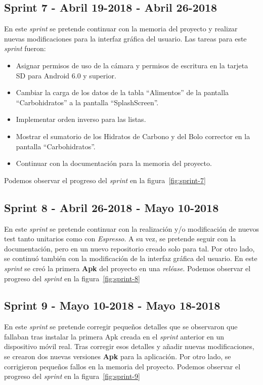 \subsection{Sprint 7 - Abril 19-2018 - Abril 26-2018}
En este \textit{sprint} se pretende continuar con la memoria del proyecto y realizar nuevas modificaciones para la interfaz gráfica del usuario. Las tareas para este \textit{sprint} fueron:
\begin{itemize}
	\item Asignar permisos de uso de la cámara y permisos de escritura en la tarjeta SD para Android 6.0 y superior.
	\item Cambiar la carga de los datos de la tabla ``Alimentos'' de la pantalla ``Carbohidratos'' a la pantalla ``SplashScreen''.
	\item Implementar orden inverso para las listas.
	\item Mostrar el sumatorio de los Hidratos de Carbono y del Bolo corrector en la pantalla ``Carbohidratos''.
	\item Continuar con la documentación para la memoria del proyecto.
\end{itemize}
Podemos observar el progreso del \textit{sprint} en la figura~\ref{fig:sprint-7}
\subsection{Sprint 8 - Abril 26-2018 - Mayo 10-2018}
En este \textit{sprint} se pretende continuar con la realización y/o modificación de nuevos test tanto unitarios como con \textit{Espresso}. A su vez, se pretende seguir con la documentación, pero en un nuevo repositorio creado solo para tal.
Por otro lado, se continuó también con la modificación de la interfaz gráfica del usuario.
En este \textit{sprint} se creó la primera \textbf{Apk} del proyecto en una \textit{reléase}.
Podemos observar el progreso del \textit{sprint} en la figura~\ref{fig:sprint-8}
\subsection{Sprint 9 - Mayo 10-2018 - Mayo 18-2018}
En este \textit{sprint} se pretende corregir pequeños detalles que se observaron que fallaban tras instalar la primera Apk creada en el \textit{sprint} anterior en un dispositivo móvil real.
Tras corregir esos detalles y añadir nuevas modificaciones, se crearon dos nuevas versiones \textbf{Apk} para la aplicación. 
Por otro lado, se corrigieron pequeños fallos en la memoria del proyecto.
Podemos observar el progreso del \textit{sprint} en la figura~\ref{fig:sprint-9}

